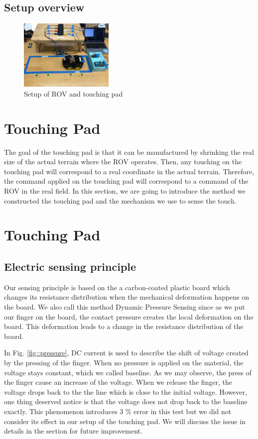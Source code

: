 \documentclass[reprint,amsmath, amsfonts, amssymb, aps, letterpaper]{revtex4-1}
\begin{document}
\subsection{Setup overview}
\begin{figure}[h]
\centering
    \includegraphics[width=0.4\textwidth]{./figure/setup}     
       \caption{Setup of ROV and touching pad }
    \label{fig::setup}
\end{figure}

\section{Touching Pad}
The goal of the touching pad is that it can be manufactured by shrinking the real size of the actual terrain where the ROV operates. Then, any touching on the touching pad will correspond to a real coordinate in the actual terrain. Therefore, the command applied on the touching pad will correspond to a command of the ROV in the real field. In this section, we are going to introduce the method we constructed the touching pad and the mechanism we use to sense the touch.


\section{Touching Pad}

\subsection{Electric sensing principle}
Our sensing principle is based on the a carbon-coated plastic board which changes its resistance distribution when the mechanical deformation happens on the board. We also call this method Dynamic Pressure Sensing since as we put our finger on the board, the contact pressure creates the local deformation on the board. This deformation leads to a change in the resistance distribution of the board. 

In Fig. \ref{fig::pressure}, DC current is used to describe the shift of voltage created by the pressing of the finger. When no pressure is applied on the material, the voltage stays constant, which we called baseline. As we may observe, the press of the finger cause an increase of the voltage. When we release the finger, the voltage drops back to the the line which is close to the initial voltage. However, one thing deserved notice is that the voltage does not drop back to the baseline exactly. This phenomenon introduces 3 \% error in this test but we did not consider its effect in our setup of the touching pad. We will discuss the issue in details in the section for future improvement.
\end{document}
